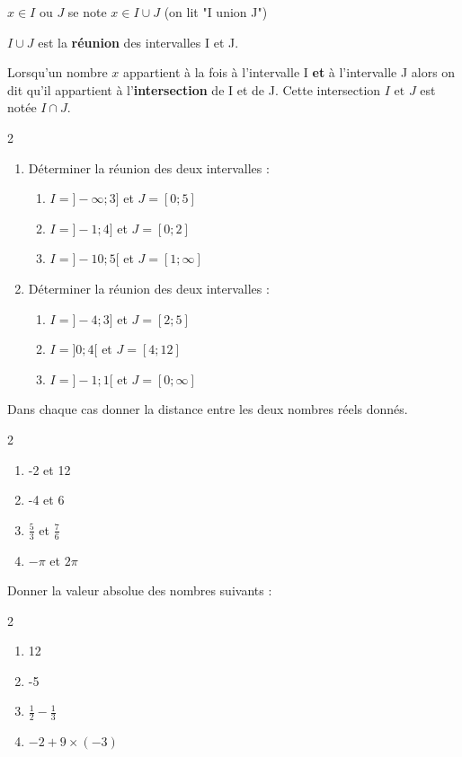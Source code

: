$x \in I\text{ ou }J$ se note $x \in I\cup J$ (on lit "I union J")

$I \cup J$ est la \textbf{réunion} des intervalles I et J.

\medskip

Lorsqu'un nombre $x$ appartient à la fois à l'intervalle I \textbf{et} à l'intervalle J alors on dit qu'il appartient à l'\textbf{intersection} de I et de J. Cette intersection $I\text{ et }J$ est notée $I\cap J$. 


\begin{multicols}{2}
\begin{enumerate}
\item Déterminer la réunion des deux intervalles :
\begin{enumerate}
\item $I = ]-\infty ; 3]$ et $J=[0 ; 5]$
\item $I = ]-1 ; 4]$ et $J=[0 ; 2]$
\item $I = ]-10 ; 5[$ et $J=[1 ; \infty]$
\end{enumerate}


\item Déterminer la réunion des deux intervalles :
\begin{enumerate}
\item $I = ]-4 ; 3]$ et $J=[2 ; 5]$
\item $I = ]0 ; 4[$ et $J=[4 ; 12]$
\item $I = ]-1 ; 1[$ et $J=[0 ; \infty]$
\end{enumerate}
\end{enumerate}
\end{multicols}


 \exo %

Dans chaque cas donner la distance entre les deux nombres réels donnés.
\begin{multicols}{2}
\begin{enumerate}
\item -2 et 12 
\item -4 et 6
\item $\frac{5}{3}$ et $\frac{7}{6}$
\item $-\pi$ et $2\pi$
\end{enumerate}
\end{multicols}

\medskip

\exo %

Donner la valeur absolue des nombres suivants :
\begin{multicols}{2}
\begin{enumerate}
\item 12 
\item -5
\item $\frac{1}{2}-\frac{1}{3}$
\item $-2 + 9 \times (-3)$
\end{enumerate}
\end{multicols}


